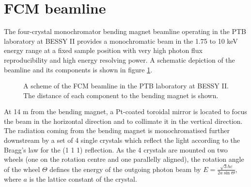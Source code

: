 \section{FCM beamline}
\label{sec:fcm}

The four-crystal monochromator bending magnet beamline operating in the PTB laboratory at BESSY II \citep{krumrey_design_1998, krumrey_high-accuracy_2001} provides a monochromatic beam in the 1.75 to 10 keV energy range at a fixed sample position with very high photon flux reproducibility and high energy resolving power. A schematic depiction of the beamline and its components is shown in figure \ref{fig:FCMScheme}.

\begin{figure}%
	\centering
		\caption[Diagram of the four-crystal monochromator beamline.]{A scheme of the FCM beamline in the PTB laboratory at BESSY II. The distance of each component to the bending magnet is shown.}
		\label{fig:FCMScheme}
\end{figure}

At 14 m from the bending magnet, a Pt-coated toroidal mirror is located to focus the beam in the horizontal direction and to collimate it in the vertical direction. The radiation coming from the bending magnet is monochromatised further downstream by a set of 4 single crystals which reflect the light according to the Bragg's law for the (1 1 1) reflection. As the 4 crystals are mounted on two wheels (one on the rotation centre and one parallelly aligned), the rotation angle of the wheel $\Theta$ defines the energy of the outgoing photon beam by $E=\frac{\sqrt{3}h c}{2a\sin{\Theta}}$, where $a$ is the lattice constant of the crystal.

